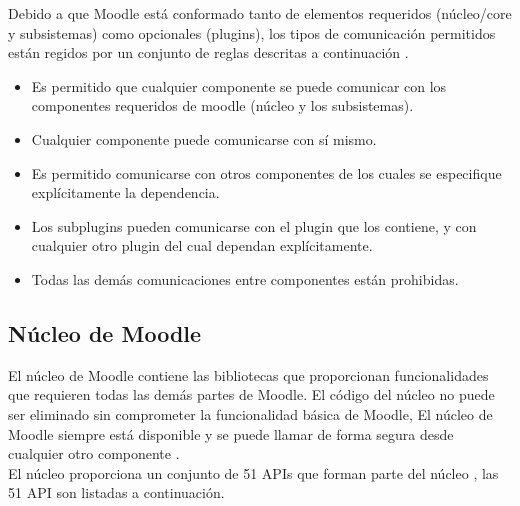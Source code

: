 

 \noindent Debido a que Moodle está conformado tanto de elementos requeridos (núcleo/core y subsistemas)
 como opcionales (plugins), los tipos de comunicación permitidos están regidos por un conjunto de reglas
 descritas a continuación \cite{moodleComponets}.


    \begin{itemize}
    \item Es permitido que cualquier componente se puede comunicar con los componentes
          requeridos de moodle (núcleo y los subsistemas).

    \item Cualquier componente puede comunicarse con sí mismo.

    \item Es permitido comunicarse con otros componentes de los cuales se especifique
          explícitamente la dependencia.

    \item Los subplugins pueden comunicarse con el plugin que los contiene, y con cualquier
          otro plugin del cual dependan explícitamente.

    \item Todas las demás comunicaciones entre componentes están prohibidas.
    \end{itemize}


\subsection{Núcleo de Moodle}

 El núcleo de Moodle contiene las bibliotecas que proporcionan funcionalidades que requieren todas
 las demás partes de Moodle. El código del núcleo no puede ser eliminado sin comprometer la funcionalidad
 básica de Moodle, El núcleo de Moodle siempre está disponible y se puede llamar de forma segura desde
 cualquier otro componente \cite{moodleComponets}.\\

 \noindent El núcleo proporciona un conjunto de 51 APIs que forman parte del núcleo \cite{moodleCoreAPIs},
 las 51 API son listadas a continuación. %

